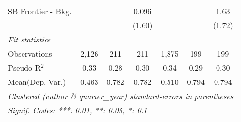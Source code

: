 \begin{tabular}{lcccccc}
   SB Frontier - Bkg.           &                &              & 0.096        &                &              & 1.63\\   
                                &                &              & (1.60)       &                &              & (1.72)\\   
   \midrule
   \emph{Fit statistics}\\
   Observations                 & 2,126          & 211          & 211          & 1,875          & 199          & 199\\  
   Pseudo R$^2$                 & 0.33           & 0.28         & 0.30         & 0.34           & 0.29         & 0.30\\  
Mean(Dep. Var.) & 0.463 & 0.782 & 0.782 & 0.510 & 0.794 & 0.794 \\
   \midrule \midrule
   \multicolumn{7}{l}{\emph{Clustered (author \& quarter\_year) standard-errors in parentheses}}\\
   \multicolumn{7}{l}{\emph{Signif. Codes: ***: 0.01, **: 0.05, *: 0.1}}\\
\end{tabular}
\par\endgroup
